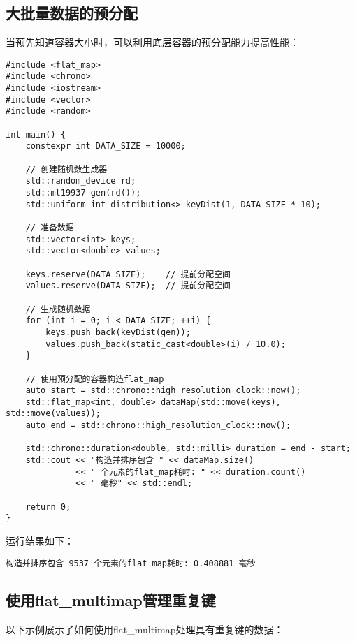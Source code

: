 \documentclass[a4paper, 12pt]{article}
\begin{document}
\subsection{大批量数据的预分配}

当预先知道容器大小时，可以利用底层容器的预分配能力提高性能：

\begin{lstlisting}[style=cpp]
#include <flat_map>
#include <chrono>
#include <iostream>
#include <vector>
#include <random>

int main() {
    constexpr int DATA_SIZE = 10000;
    
    // 创建随机数生成器
    std::random_device rd;
    std::mt19937 gen(rd());
    std::uniform_int_distribution<> keyDist(1, DATA_SIZE * 10);
    
    // 准备数据
    std::vector<int> keys;
    std::vector<double> values;
    
    keys.reserve(DATA_SIZE);    // 提前分配空间
    values.reserve(DATA_SIZE);  // 提前分配空间
    
    // 生成随机数据
    for (int i = 0; i < DATA_SIZE; ++i) {
        keys.push_back(keyDist(gen));
        values.push_back(static_cast<double>(i) / 10.0);
    }
    
    // 使用预分配的容器构造flat_map
    auto start = std::chrono::high_resolution_clock::now();
    std::flat_map<int, double> dataMap(std::move(keys), std::move(values));
    auto end = std::chrono::high_resolution_clock::now();
    
    std::chrono::duration<double, std::milli> duration = end - start;
    std::cout << "构造并排序包含 " << dataMap.size() 
              << " 个元素的flat_map耗时: " << duration.count() 
              << " 毫秒" << std::endl;
    
    return 0;
}
\end{lstlisting}

运行结果如下：

\begin{lstlisting}[style=cpp]
构造并排序包含 9537 个元素的flat_map耗时: 0.408881 毫秒
\end{lstlisting}

\subsection{使用flat\_multimap管理重复键}

以下示例展示了如何使用flat\_multimap处理具有重复键的数据：
\end{document}
